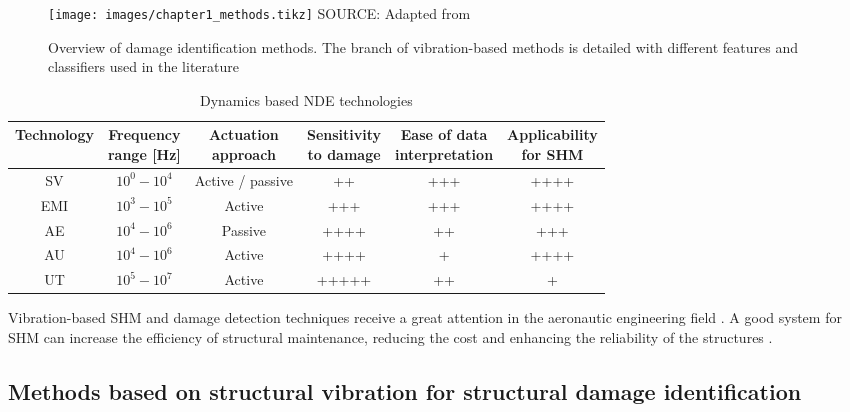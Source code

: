 \begin{figure}
\caption{Overview of damage identification methods. The branch of vibration-based methods is detailed with different features and classifiers used in the literature}
\label{fig:methods}
\centering
\vspace{1em}
\resizebox{\textwidth}{!}
{
\texttt{[image: images/chapter1\_methods.tikz]}
}
\vspace{1em}
{\footnotesize SOURCE: Adapted from \cite{Ooijevaar2014}}
\end{figure}

\begin{table}[H]
    \caption{Dynamics based NDE technologies}
    \label{tab:my_label}
    \centering
    \footnotesize
    \begin{tabular}{cccccc}
        \toprule
        Technology & \specialcell{Frequency\\range [Hz]} & \specialcell{Actuation\\approach} & \specialcell{Sensitivity\\to damage} & \specialcell{Ease of data\\interpretation} & \specialcell{Applicability\\for SHM} \\
        \midrule
         SV & $10^0 - 10^4$ & Active / passive & ++ & +++ & ++++ \\
         EMI & $10^3 - 10^5$ & Active & +++ & +++ & ++++ \\
         AE & $10^4 - 10^6$ & Passive & ++++ & ++ & +++ \\
         AU & $10^4 - 10^6$ & Active & ++++ & + & ++++ \\
         UT & $10^5 - 10^7$ & Active & +++++ & ++ & + \\
         \bottomrule
    \end{tabular}
\end{table}

Vibration-based SHM and damage detection techniques receive a great attention in the aeronautic engineering field \cite{Liu2012}. A good system for SHM can increase the efficiency of structural maintenance, reducing the cost and enhancing the reliability of the structures \cite{de2016shm}.

\subsection{Methods based on structural vibration for structural damage identification}
\label{sec:methods}

